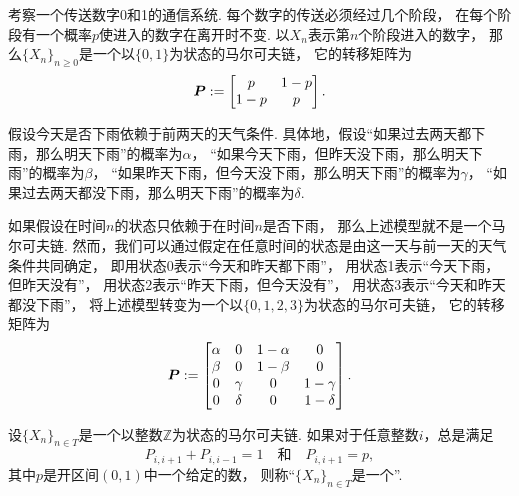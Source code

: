 \begin{example}[通信系统]
考察一个传送数字0和1的通信系统.
每个数字的传送必须经过几个阶段，
在每个阶段有一个概率\(p\)使进入的数字在离开时不变.
以\(X_n\)表示第\(n\)个阶段进入的数字，
那么\(\{X_n\}_{n\geq0}\)是一个以\(\{0,1\}\)为状态的马尔可夫链，
它的转移矩阵为\begin{equation*}
	\boldsymbol{P} := \begin{bmatrix}
		p & 1-p \\
		1-p & p
	\end{bmatrix}.
\end{equation*}
\end{example}

\begin{example}[将一个过程转变为马尔可夫链]
假设今天是否下雨依赖于前两天的天气条件.
具体地，假设“如果过去两天都下雨，那么明天下雨”的概率为\(\alpha\)，
“如果今天下雨，但昨天没下雨，那么明天下雨”的概率为\(\beta\)，
“如果昨天下雨，但今天没下雨，那么明天下雨”的概率为\(\gamma\)，
“如果过去两天都没下雨，那么明天下雨”的概率为\(\delta\).

如果假设在时间\(n\)的状态只依赖于在时间\(n\)是否下雨，
那么上述模型就不是一个马尔可夫链.
然而，我们可以通过假定在任意时间的状态是由这一天与前一天的天气条件共同确定，
即用状态0表示“今天和昨天都下雨”，
用状态1表示“今天下雨，但昨天没有”，
用状态2表示“昨天下雨，但今天没有”，
用状态3表示“今天和昨天都没下雨”，
将上述模型转变为一个以\(\{0,1,2,3\}\)为状态的马尔可夫链，
它的转移矩阵为\begin{equation*}
	\boldsymbol{P} := \begin{bmatrix}
		\alpha & 0 & 1-\alpha & 0 \\
		\beta & 0 & 1-\beta & 0 \\
		0 & \gamma & 0 & 1-\gamma \\
		0 & \delta & 0 & 1-\delta
	\end{bmatrix}.
\end{equation*}
\end{example}

\begin{definition}
设\(\{X_n\}_{n \in T}\)是一个以整数\(\mathbb{Z}\)为状态的马尔可夫链.
如果对于任意整数\(i\)，总是满足\begin{equation*}
	P_{i,i+1} + P_{i,i-1} = 1
	\quad\text{和}\quad
	P_{i,i+1} = p,
\end{equation*}
其中\(p\)是开区间\((0,1)\)中一个给定的数，
则称“\(\{X_n\}_{n \in T}\)是一个”.
\end{definition}

